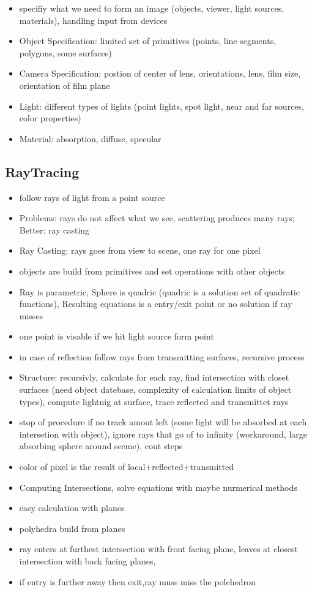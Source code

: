 \documentclass[11pt,a4paper]{article}
\begin{document}
\begin{itemize}
\begin{itemize}
				\item specifiy what we need to form an image (objects, viewer, light sources, materials), handling input from devices
				\item Object Specification: limited set of primitives (points, line segments, polygons, some surfaces)
				\item Camera Specification: postion of center of lens, orientations, lens, film size, orientation of film plane
				\item Light: different types of lights (point lights, spot light, near and far sources, color properties)
				\item Material: absorption, diffuse, specular
			\end{itemize}
		\end{itemize}
	\subsection{RayTracing}
		\begin{itemize}
			\item follow rays of light from a point source
			\item Problems: rays do not affect what we see, scattering produces many rays; Better: ray casting
			\item Ray Casting: rays goes from view to scene, one ray for one pixel
			\item objects are build from primitives and set operations with other objects
			\item Ray is parametric, Sphere is quadric (quadric is a solution set of quadratic functions), Resulting equations is a entry/exit point or no solution if ray misses
			\item one point is visable if we hit light source form point
			\item in case of reflection follow rays from transmitting surfaces, recursive process
			\item Structure: recursivly, calculate for each ray, find intersection with closet surfaces (need object datebase, complexity of calculation limits of object types), compute lightnig at surface, trace reflected and transmittet rays
			\item stop of procedure if no track amout left (some light will be absorbed at each intersetion with object), ignore rays that go of to infinity (workaround, large absorbing sphere around sceme), cout steps
			\item color of pixel is the result of local+reflected+transmitted
			\item Computing Intersections, solve equations with maybe nurmerical methods 
			\item easy calculation with planes
			\item polyhedra build from planes
			\item ray enters at furthest intersection with front facing plane, leaves at closest intersection with back facing planes,
			\item if entry is further away then exit,ray muss miss the polehedron
		\end{itemize}
\end{document}
